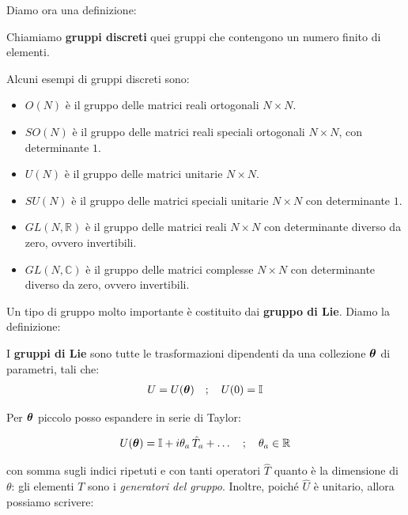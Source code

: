 	Diamo ora una definizione:
	
\begin{mydef}
	Chiamiamo \textbf{gruppi discreti} quei gruppi che contengono un numero finito di elementi.
\end{mydef}

	 Alcuni esempi di gruppi discreti sono:
	 
\begin{itemize}
	\item $O(N)$ è il gruppo delle matrici reali ortogonali $ N \times N$.
	
	\item $SO(N)$ è il gruppo delle matrici reali speciali ortogonali $N \times N$, con determinante $1$.
	
	\item $U(N)$ è il gruppo delle matrici unitarie $N \times N$.
	
	\item $SU(N)$ è il gruppo delle matrici speciali unitarie $N \times N$ con determinante $1$.
	 
	\item $GL(N, \mathbb{R})$ è il gruppo delle matrici reali $N \times N$ con determinante diverso da zero, ovvero invertibili.
	
	\item $GL(N, \mathbb{C})$ è il gruppo delle matrici complesse $N \times N$ con determinante diverso da zero, ovvero invertibili.
\end{itemize}
	
	Un tipo di gruppo molto importante è costituito dai \textbf{gruppo di Lie}. Diamo la definizione:
	
\begin{mydef}
	I \textbf{gruppi di Lie} sono tutte le trasformazioni dipendenti da una collezione $\vb*{\theta}$ di parametri, tali che:
\begin{align*}
	U = U(\vb*{\theta}) \quad ; \quad U(0) = \mathbb{I}
\end{align*}
\end{mydef}

	Per $\vb*{\theta}$ piccolo posso espandere in serie di Taylor:
	
\begin{align*}
	U(\vb*{\theta}) = \mathbb{I} + i \theta_a \, \hat{T}_a + \ldots \quad ; \quad \theta_a \in \mathbb{R}
\end{align*}
	
	con somma sugli indici ripetuti e con tanti operatori $\hat{T}$ quanto è la dimensione di $\theta$: gli elementi $T$ sono i \textit{generatori del gruppo}. Inoltre, poiché $\hat{U}$ è unitario, allora possiamo scrivere:
	
